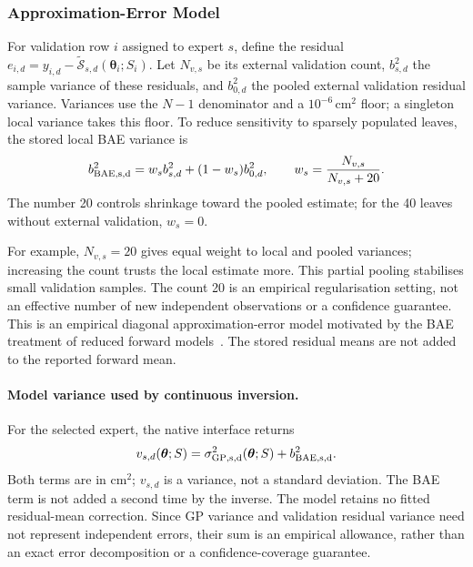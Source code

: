 \subsubsection{Approximation-Error Model}
\label{sec:surr-mono}
For validation row $i$ assigned to expert $s$, define the residual
$e_{i,d}=y_{i,d}-\tilde{\mathcal S}_{s,d}(\boldsymbol\theta_i;S_i)$.
Let $N_{v,s}$ be its external validation count, $b_{s,d}^2$ the
sample variance of these residuals, and $b_{0,d}^2$ the pooled external
validation residual variance. Variances use the $N-1$ denominator and
a $10^{-6}\,\mathrm{cm}^2$ floor; a singleton local variance takes this
floor. To reduce sensitivity to sparsely populated leaves, the stored
local BAE variance is
\begin{equation}
\label{eq:bae-shrinkage}
 b_{\rm BAE,s,d}^2=w_s b_{s,d}^2+(1-w_s)b_{0,d}^2,
 \qquad w_s=\frac{N_{v,s}}{N_{v,s}+20}.
\end{equation}
The number 20 controls shrinkage toward the pooled estimate; for the
40 leaves without external validation, $w_s=0$.

For example, $N_{v,s}=20$ gives equal weight to local and pooled
variances; increasing the count trusts the local estimate more. This
partial pooling stabilises small validation samples. The count 20 is
an empirical regularisation setting, not an effective number of new
independent observations or a confidence guarantee.
This is an empirical diagonal approximation-error model motivated by
the BAE treatment of reduced forward models~\cite{kaipio2005statistical}.
The stored residual means are not added to the reported forward mean.

\paragraph{Model variance used by continuous inversion.}
For the selected expert, the native interface returns
\begin{equation}
\label{eq:native-model-variance}
 v_{s,d}(\boldsymbol\theta;S)
 =\sigma_{\rm GP,s,d}^2(\boldsymbol\theta;S)
   +b_{\rm BAE,s,d}^2.
\end{equation}
Both terms are in $\mathrm{cm}^2$; $v_{s,d}$ is a variance, not a
standard deviation. The BAE term is not added a second time by the
inverse. The model retains no fitted residual-mean correction. Since
GP variance and validation residual variance need not represent
independent errors, their sum is an empirical allowance, rather than
an exact error decomposition or a confidence-coverage guarantee.

